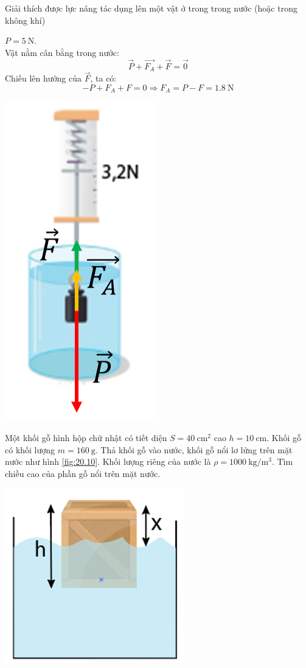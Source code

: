 \begin{dang}{Giải thích được lực nâng tác dụng lên một vật ở trong trong nước (hoặc trong không khí)}
{{\begin{enumerate}[label=\alph*)]
\begin{minipage}[l]{0.6\textwidth}
	$P=\SI{5}{\newton}$.\\
	Vật nằm cân bằng trong nước:
	$$\overrightarrow{P}+\overrightarrow{F_A}+\overrightarrow{F}=\vec{0}$$
	Chiếu lên hướng của $\overrightarrow{F}$, ta có:
	$$-P+F_A+F=0\Rightarrow F_A=P-F=\SI{1.8}{\newton}$$
	\end{minipage}
	\begin{minipage}{0.4\textwidth}
		\begin{center}
			\includegraphics[width=0.3\linewidth]{../figs/VN10-2023-PH-TP020-9}
		\end{center}
	\end{minipage}

\end{enumerate}
}}

{Một khối gỗ hình hộp chữ nhật có tiết diện $S=\SI{40}{\centi\meter^2}$ cao $h=\SI{10}{\centi\meter}$. Khối gỗ có khối lượng $m=\SI{160}{\gram}$. Thả khối gỗ vào nước, khối gỗ nổi lơ lửng trên mặt nước như hình \ref{fig:20.10}. Khối lượng riêng của nước là $\rho=\SI{1000}{\kilogram/\meter^3}$. Tìm chiều cao của phần gỗ nổi trên mặt nước.
	\begin{center}
		\includegraphics[width=0.2\linewidth]{../figs/VN10-2023-PH-TP020-10}
		\label{fig:20.10}
	\end{center}
}
{}
\end{dang}